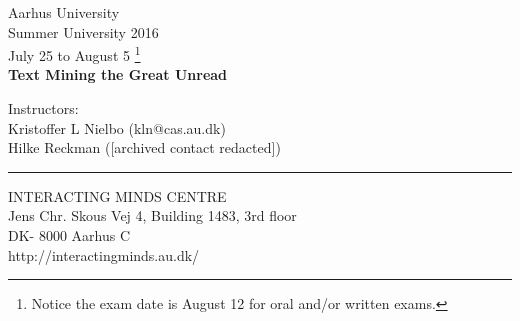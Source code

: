 \documentclass[12pt,a4paper]{article}
\author{Kristoffer L. Nielbo}
\begin{document}

\begin{center}
{\large Aarhus University}\\
\bigskip
{\large Summer University 2016}\\
July 25 to August 5 \footnote{Notice the exam date is August 12 for oral and/or written exams.}\\
\bigskip
{\LARGE\textbf{Text Mining the Great Unread}}\\
\end{center}
\bigskip
Instructors:\\
Kristoffer L Nielbo (kln@cas.au.dk) \\ 
Hilke Reckman ([archived contact redacted])\\
\noindent\rule{4cm}{0.4pt}
\bigskip

\noindent INTERACTING MINDS CENTRE\\ 
Jens Chr. Skous Vej 4, Building 1483, 3rd floor\\
DK- 8000 Aarhus C\\
http://interactingminds.au.dk/\\

\noindent\makebox[\linewidth]{\rule{\paperwidth}{0.4pt}}
\end{document}

